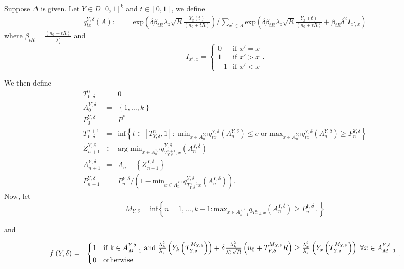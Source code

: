 \documentclass[12pt,english]{article}
\begin{document}
Suppose $\Delta$ is given. Let$ $ $Y\in D\left[0,1\right]^{k}$
and $t\in\left[0,1\right]$, we define
\begin{eqnarray*}
q_{tx}^{Y,\delta}\left(A\right): & = & \mbox{exp}\left(\delta\beta_{tR}\lambda_{z}\sqrt{R}\frac{Y_{x}\left(t\right)}{\left(n_{0}+tR\right)}\right)/\sum_{x^{'}\in A}\mbox{exp}\left(\delta\beta_{tR}\lambda_{z}\sqrt{R}\frac{Y_{x^{'}}\left(t\right)}{\left(n_{0}+tR\right)}+\beta_{tR}\delta^{2}I_{x',x}\right)
\end{eqnarray*}
where $\beta_{tR}=\frac{\left(n_{0}+tR\right)}{\lambda_{z}^{2}}$
and 
\[
I_{x',x}=\begin{cases}
0 & \mbox{if }x'=x\\
1 & \mbox{if }x'>x\\
-1 & \mbox{if }x'<x
\end{cases}.
\]


We then define
\[
\]
\begin{eqnarray*}
T_{Y,\delta}^{0} & = & 0\\
A_{0}^{Y,\delta} & = & \left\{ 1,\ldots,k\right\} \\
P_{0}^{Y,\delta} & = & P^{*}\\
T_{Y,\delta}^{n+1} & = & \mbox{inf}\left\{ t\in\left[T_{Y,\delta}^{n},1\right]:\mbox{ min}_{x\in A_{n}^{Y,\delta}}q_{tx}^{Y,\delta}\left(A_{n}^{Y,\delta}\right)\leq c\mbox{ or }\mbox{max}_{x\in A_{n}^{Y,\delta}}q_{tx}^{Y,\delta}\left(A_{n}^{Y,\delta}\right)\geq P_{n}^{Y,\delta}\right\} \\
Z_{n+1}^{Y,\delta} & \in & \mbox{arg min}_{x\in A_{n}^{Y,\delta}}q_{T_{Y,\delta}^{n+1},x}^{Y,\delta}\left(A_{n}^{Y,\delta}\right)\\
A_{n+1}^{Y,\delta} & = & A_{n}-\left\{ Z_{n+1}^{Y,\delta}\right\} \\
P_{n+1}^{Y,\delta} & = & P_{n}^{Y,\delta}/\left(1-\mbox{min}_{x\in A_{n}^{Y,\delta}}q_{T_{Y,\delta}^{n+1}x}^{Y,\delta}\left(A_{n}^{Y,\delta}\right)\right).
\end{eqnarray*}
Now, let
\[
M_{Y,\delta}=\mbox{inf}\left\{ n=1,\ldots,k-1:\mbox{max}_{x\in A_{n-1}^{Y,\delta}}q_{T_{Y,\delta}^{n},x}\left(A_{n}^{Y,\delta}\right)\geq P_{n-1}^{Y,\delta}\right\} 
\]


and

\begin{eqnarray*}
f\left(Y,\delta\right) & = & \begin{cases}
1 & \mbox{if }\mbox{k}\in A_{M-1}^{Y,\delta}\mbox{ and }\frac{\lambda_{k}^{2}}{\lambda_{z}}\left(Y_{k}\left(T_{Y,\delta}^{M_{Y,\delta}}\right)\right)+\delta\frac{\lambda_{k}^{2}}{\lambda_{z}^{2}\sqrt{R}}\left(n_{0}+T_{Y,\delta}^{M_{Y,\delta}}R\right)\geq\frac{\lambda_{x}^{2}}{\lambda_{z}}\left(Y_{x}\left(T_{Y,\delta}^{M_{Y,\delta}}\right)\right)\mbox{ }\mbox{\ensuremath{\forall}}x\in A_{M-1}^{Y,\delta}\\
0 & \mbox{otherwise}
\end{cases}.
\end{eqnarray*}
\end{document}
